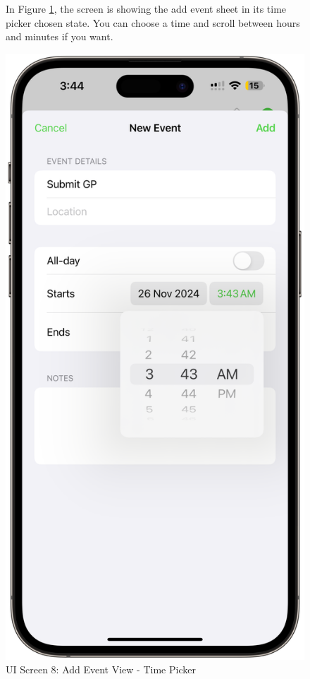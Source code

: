 \begin{figure}[!h]
    \begin{minipage}{0.65\textwidth}
        In Figure \ref{fig:ui-screen-8}, the screen is showing the add event sheet in its time picker chosen state. You can choose a time and scroll between hours and minutes if you want.
    \end{minipage}
    \hfill
    \begin{minipage}{0.3\textwidth}
        \centering
        \includegraphics[width=\textwidth]{images/screen8.png}
        \caption{UI Screen 8: Add Event View - Time Picker}
        \label{fig:ui-screen-8}
    \end{minipage}
\end{figure}

